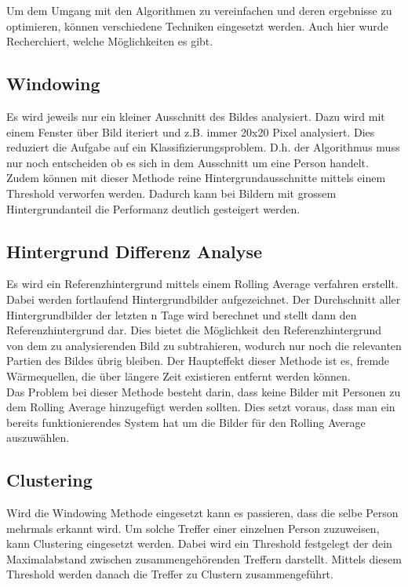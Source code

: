 Um dem Umgang mit den Algorithmen zu vereinfachen und deren ergebnisse zu optimieren, können verschiedene Techniken eingesetzt werden. Auch hier wurde Recherchiert, welche Möglichkeiten es gibt.


\subsection{Windowing}

Es wird jeweils nur ein kleiner Ausschnitt des Bildes analysiert. Dazu wird mit einem Fenster über Bild iteriert und z.B. immer 20x20 Pixel analysiert. Dies reduziert die Aufgabe auf ein Klassifizierungsproblem. D.h. der Algorithmus muss nur noch entscheiden ob es sich in dem Ausschnitt um eine Person handelt. Zudem können mit dieser Methode reine Hintergrundausschnitte mittels einem Threshold verworfen werden. Dadurch kann bei Bildern mit grossem Hintergrundanteil die Performanz deutlich gesteigert werden.


\subsection{Hintergrund Differenz Analyse}

Es wird ein Referenzhintergrund mittels einem Rolling Average verfahren erstellt. Dabei werden fortlaufend Hintergrundbilder aufgezeichnet. Der Durchschnitt aller Hintergrundbilder der letzten n Tage wird berechnet und stellt dann den Referenzhintergrund dar. Dies bietet die Möglichkeit den Referenzhintergrund von dem zu analysierenden Bild zu subtrahieren, wodurch nur noch die relevanten Partien des Bildes übrig bleiben. Der Haupteffekt dieser Methode ist es, fremde Wärmequellen, die über längere Zeit existieren entfernt werden können.\\
Das Problem bei dieser Methode besteht darin, dass keine Bilder mit Personen zu dem Rolling Average hinzugefügt werden sollten. Dies setzt voraus, dass man ein bereits funktionierendes System hat um die Bilder für den Rolling Average auszuwählen.


\subsection{Clustering}

Wird die Windowing Methode eingesetzt kann es passieren, dass die selbe Person mehrmals erkannt wird. Um solche Treffer einer einzelnen Person zuzuweisen, kann Clustering eingesetzt werden. Dabei wird ein Threshold festgelegt der dein Maximalabstand zwischen zusammengehörenden Treffern darstellt. Mittels diesem Threshold werden danach die Treffer zu Clustern zusammengeführt.


